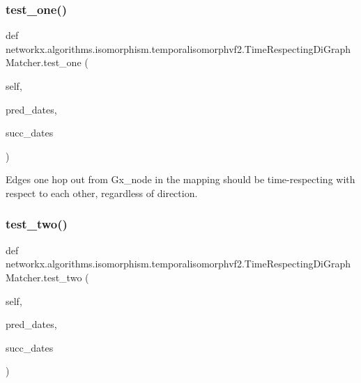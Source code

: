 \subsubsection{\texorpdfstring{test\+\_\+one()}{test\_one()}}
{\footnotesize\ttfamily def networkx.\+algorithms.\+isomorphism.\+temporalisomorphvf2.\+Time\+Respecting\+Di\+Graph\+Matcher.\+test\+\_\+one (\begin{DoxyParamCaption}\item[{}]{self,  }\item[{}]{pred\+\_\+dates,  }\item[{}]{succ\+\_\+dates }\end{DoxyParamCaption})}

\begin{DoxyVerb}Edges one hop out from Gx_node in the mapping should be
time-respecting with respect to each other, regardless of
direction.
\end{DoxyVerb}
 \mbox{\label{classnetworkx_1_1algorithms_1_1isomorphism_1_1temporalisomorphvf2_1_1TimeRespectingDiGraphMatcher_a2e50c62dc4d22f0c19a49cde761abf6d}} 
\subsubsection{\texorpdfstring{test\+\_\+two()}{test\_two()}}
{\footnotesize\ttfamily def networkx.\+algorithms.\+isomorphism.\+temporalisomorphvf2.\+Time\+Respecting\+Di\+Graph\+Matcher.\+test\+\_\+two (\begin{DoxyParamCaption}\item[{}]{self,  }\item[{}]{pred\+\_\+dates,  }\item[{}]{succ\+\_\+dates }\end{DoxyParamCaption})}

